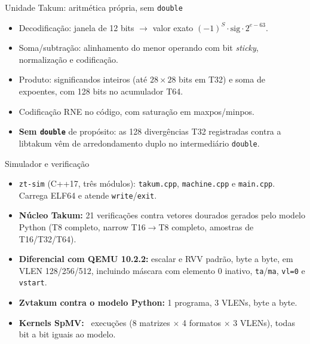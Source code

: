 \documentclass[aspectratio=169,10pt]{beamer}
\begin{document}
\begin{frame}{Unidade Takum: aritmética própria, sem \texttt{double}}
	\begin{itemize}
		\item Decodificação: janela de 12 bits $\to$ valor exato
		      $(-1)^{S} \cdot \mathrm{sig} \cdot 2^{e-63}$.
		\item Soma/subtração: alinhamento do menor operando com bit
		      \emph{sticky}, normalização e codificação.
		\item Produto: significandos inteiros (até $28\times28$ bits em T32)
		      e soma de expoentes, com 128 bits no acumulador T64.
		\item Codificação RNE no código, com saturação em maxpos/minpos.
		\item \textbf{Sem \texttt{double}} de propósito: as 128 divergências
		      T32 registradas contra a libtakum vêm de arredondamento duplo no
		      intermediário \texttt{double}.
	\end{itemize}
\end{frame}

\begin{frame}{Simulador e verificação}
	\begin{itemize}
		\item \texttt{zt-sim} (C++17, três módulos): \texttt{takum.cpp},
		      \texttt{machine.cpp} e \texttt{main.cpp}. Carrega ELF64 e atende
		      \texttt{write}/\texttt{exit}.
		\item \textbf{Núcleo Takum:} 21 verificações contra vetores dourados
		      gerados pelo modelo Python (T8 completo, narrow T16$\to$T8
		      completo, amostras de T16/T32/T64).
		\item \textbf{Diferencial com QEMU 10.2.2:} escalar e RVV padrão,
		      byte a byte, em VLEN 128/256/512, incluindo máscara com elemento
		      0 inativo, \texttt{ta}/\texttt{ma}, \texttt{vl=0} e
		      \texttt{vstart}.
		\item \textbf{Zvtakum contra o modelo Python:} 1 programa, 3 VLENs,
		      byte a byte.
		\item \textbf{Kernels SpMV:} \NumExecSpmv\ execuções (8 matrizes
		      $\times$ 4 formatos $\times$ 3 VLENs), todas bit a bit iguais ao
		      modelo.
	\end{itemize}
\end{frame}
\end{document}
